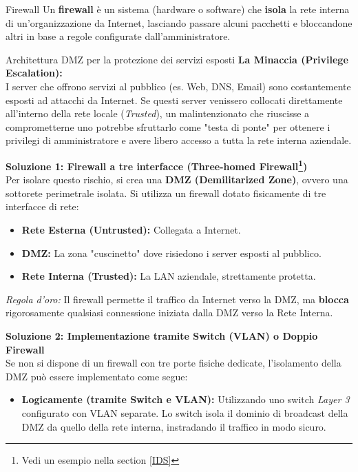 \documentclass[a4paper,12pt]{report}
\begin{document}
\begin{defbox}{Firewall}
Un \textbf{firewall} \`e un sistema (hardware o software) che \textbf{isola} la rete
interna di un'organizzazione da Internet, lasciando passare alcuni pacchetti e
bloccandone altri in base a regole configurate dall'amministratore.
\end{defbox}


\begin{esempiobox}{Architettura DMZ per la protezione dei servizi esposti}
\textbf{La Minaccia (Privilege Escalation):} \\
I server che offrono servizi al pubblico (es. Web, DNS, Email) sono costantemente esposti ad attacchi da Internet. Se questi server venissero collocati direttamente all'interno della rete locale (\textit{Trusted}), un malintenzionato che riuscisse a comprometterne uno potrebbe sfruttarlo come "testa di ponte" per ottenere i privilegi di amministratore e avere libero accesso a tutta la rete interna aziendale.

\textbf{Soluzione 1: Firewall a tre interfacce (Three-homed Firewall\footnote{Vedi un esempio nella section \ref{IDS}})} \\
Per isolare questo rischio, si crea una \textbf{DMZ (Demilitarized Zone)}, ovvero una sottorete perimetrale isolata. Si utilizza un firewall dotato fisicamente di tre interfacce di rete:
\begin{itemize}
    \item \textbf{Rete Esterna (Untrusted):} Collegata a Internet.
    \item \textbf{DMZ:} La zona "cuscinetto" dove risiedono i server esposti al pubblico.
    \item \textbf{Rete Interna (Trusted):} La LAN aziendale, strettamente protetta.
\end{itemize}
\textit{Regola d'oro:} Il firewall permette il traffico da Internet verso la DMZ, ma \textbf{blocca} rigorosamente qualsiasi connessione iniziata dalla DMZ verso la Rete Interna.

\newpage
\textbf{Soluzione 2: Implementazione tramite Switch (VLAN) o Doppio Firewall} \\
Se non si dispone di un firewall con tre porte fisiche dedicate, l'isolamento della DMZ può essere implementato come segue:
\begin{itemize}
    \item \textbf{Logicamente (tramite Switch e VLAN):} Utilizzando uno switch \textit{Layer 3} configurato con VLAN separate. Lo switch isola il dominio di broadcast della DMZ da quello della rete interna, instradando il traffico in modo sicuro.
\end{itemize}
\end{esempiobox}
\end{document}

